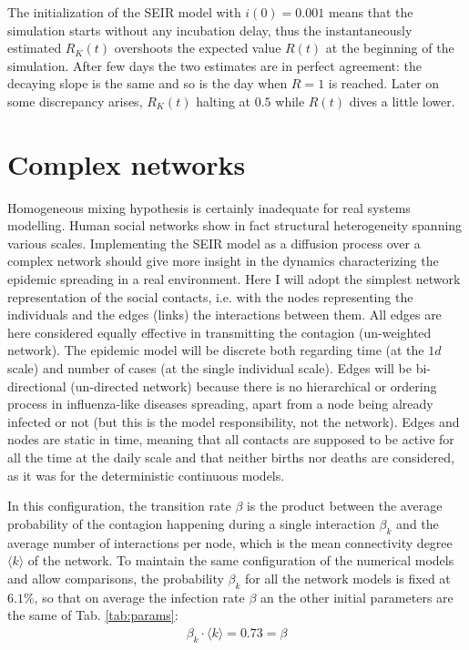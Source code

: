 \documentclass[DIV=12, BCOR=0pt]{scrartcl}  %
\begin{document}
	The initialization of the SEIR model with $i(0) = 0.001$ means that the simulation starts without any incubation delay, thus the instantaneously estimated $R_K(t)$ overshoots the expected value $R(t)$ at the beginning of the simulation. After few days the two estimates are in perfect agreement: the decaying slope is the same and so is the day when $R = 1$ is reached. Later on some discrepancy arises, $R_K(t)$ halting at $0.5$ while $R(t)$ dives a little lower.
 
  

  
  \section{Complex networks}
  \label{sec:network}
  Homogeneous mixing hypothesis is certainly inadequate for real systems modelling. Human social networks show in fact structural heterogeneity spanning various scales. Implementing the SEIR model as a diffusion process over a complex network should give more insight in the dynamics characterizing the epidemic spreading in a real environment. Here I will adopt the simplest network representation of the social contacts, i.e. with the nodes representing the individuals and the edges (links) the interactions between them. All edges are here considered equally effective in transmitting the contagion (un-weighted network). The epidemic model will be discrete both regarding time (at the $1 d$ scale) and number of cases (at the single individual scale). Edges will be bi-directional (un-directed network) because there is no hierarchical or ordering process in influenza-like diseases spreading, apart from a node being already infected or not (but this is the model responsibility, not the network). Edges and nodes are static in time, meaning that all contacts are supposed to be active for all the time at the daily scale and that neither births nor deaths are considered, as it was for the deterministic continuous models. 
  
  In this configuration, the transition rate $\beta$ is the product between the average probability of the contagion happening during a single interaction $\beta_k$ and the average number of interactions per node, which is the mean connectivity degree $\langle k \rangle$ of the network. 
  To maintain the same configuration of the numerical models and allow comparisons, the probability $\beta_k$ for all the network models is fixed at $6.1 \%$, so that on average the infection rate $\beta$ an the other initial parameters are the same of Tab. \ref{tab:params}:
  \begin{align}
  	\beta_k \cdot \langle k \rangle = 0.73 = \beta
  \end{align}
\end{document}
